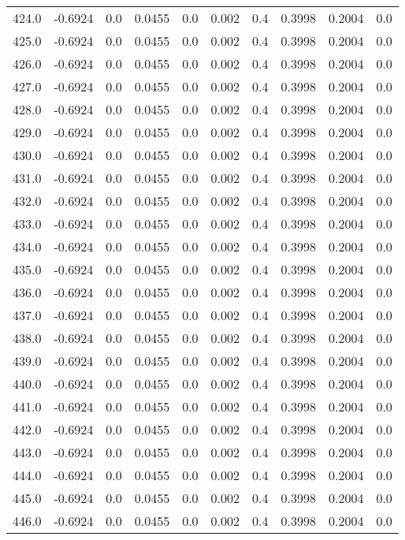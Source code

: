 \begin{longtable}{lrrrrrrrrr}
424.0 & -0.6924 & 0.0 & 0.0455 & 0.0 & 0.002 & 0.4 & 0.3998 & 0.2004 & 0.0 \\
425.0 & -0.6924 & 0.0 & 0.0455 & 0.0 & 0.002 & 0.4 & 0.3998 & 0.2004 & 0.0 \\
426.0 & -0.6924 & 0.0 & 0.0455 & 0.0 & 0.002 & 0.4 & 0.3998 & 0.2004 & 0.0 \\
427.0 & -0.6924 & 0.0 & 0.0455 & 0.0 & 0.002 & 0.4 & 0.3998 & 0.2004 & 0.0 \\
428.0 & -0.6924 & 0.0 & 0.0455 & 0.0 & 0.002 & 0.4 & 0.3998 & 0.2004 & 0.0 \\
429.0 & -0.6924 & 0.0 & 0.0455 & 0.0 & 0.002 & 0.4 & 0.3998 & 0.2004 & 0.0 \\
430.0 & -0.6924 & 0.0 & 0.0455 & 0.0 & 0.002 & 0.4 & 0.3998 & 0.2004 & 0.0 \\
431.0 & -0.6924 & 0.0 & 0.0455 & 0.0 & 0.002 & 0.4 & 0.3998 & 0.2004 & 0.0 \\
432.0 & -0.6924 & 0.0 & 0.0455 & 0.0 & 0.002 & 0.4 & 0.3998 & 0.2004 & 0.0 \\
433.0 & -0.6924 & 0.0 & 0.0455 & 0.0 & 0.002 & 0.4 & 0.3998 & 0.2004 & 0.0 \\
434.0 & -0.6924 & 0.0 & 0.0455 & 0.0 & 0.002 & 0.4 & 0.3998 & 0.2004 & 0.0 \\
435.0 & -0.6924 & 0.0 & 0.0455 & 0.0 & 0.002 & 0.4 & 0.3998 & 0.2004 & 0.0 \\
436.0 & -0.6924 & 0.0 & 0.0455 & 0.0 & 0.002 & 0.4 & 0.3998 & 0.2004 & 0.0 \\
437.0 & -0.6924 & 0.0 & 0.0455 & 0.0 & 0.002 & 0.4 & 0.3998 & 0.2004 & 0.0 \\
438.0 & -0.6924 & 0.0 & 0.0455 & 0.0 & 0.002 & 0.4 & 0.3998 & 0.2004 & 0.0 \\
439.0 & -0.6924 & 0.0 & 0.0455 & 0.0 & 0.002 & 0.4 & 0.3998 & 0.2004 & 0.0 \\
440.0 & -0.6924 & 0.0 & 0.0455 & 0.0 & 0.002 & 0.4 & 0.3998 & 0.2004 & 0.0 \\
441.0 & -0.6924 & 0.0 & 0.0455 & 0.0 & 0.002 & 0.4 & 0.3998 & 0.2004 & 0.0 \\
442.0 & -0.6924 & 0.0 & 0.0455 & 0.0 & 0.002 & 0.4 & 0.3998 & 0.2004 & 0.0 \\
443.0 & -0.6924 & 0.0 & 0.0455 & 0.0 & 0.002 & 0.4 & 0.3998 & 0.2004 & 0.0 \\
444.0 & -0.6924 & 0.0 & 0.0455 & 0.0 & 0.002 & 0.4 & 0.3998 & 0.2004 & 0.0 \\
445.0 & -0.6924 & 0.0 & 0.0455 & 0.0 & 0.002 & 0.4 & 0.3998 & 0.2004 & 0.0 \\
446.0 & -0.6924 & 0.0 & 0.0455 & 0.0 & 0.002 & 0.4 & 0.3998 & 0.2004 & 0.0 \\

\end{longtable}
